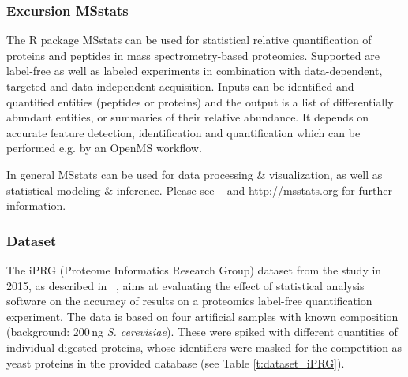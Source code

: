 \subsubsection{Excursion MSstats}
The R package MSstats can be used for statistical relative quantification of proteins and peptides in mass spectrometry-based proteomics. Supported are label-free as well as labeled experiments in combination with data-dependent, targeted and data-independent acquisition. Inputs can be identified and quantified entities (peptides or proteins) and the output is a list of differentially abundant entities, or summaries of their relative abundance. It depends on accurate feature detection, identification and quantification which can be performed e.g. by an OpenMS workflow. 

\noindent In general MSstats can be used for data processing \& visualization, as well as statistical modeling \& inference. Please see ~\cite{Choi2014MSstats} and \url{http://msstats.org} for further information.

\subsubsection{Dataset}
The iPRG (Proteome Informatics Research Group) dataset from the study in 2015, as described in ~\cite{Choi2017iPRG}, aims at evaluating the effect of statistical analysis software on the accuracy of results on a proteomics label-free quantification experiment. The data is based on four artificial samples with known composition (background: 200\,ng \emph{S. cerevisiae}). These were spiked with different quantities of individual digested proteins, whose identifiers were masked for the competition as yeast proteins in the provided database (see Table \ref{t:dataset_iPRG}).


